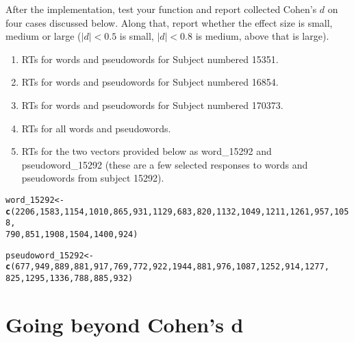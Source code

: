 \documentclass{article}\usepackage[]{graphicx}\usepackage[]{color}
\makeatletter
\newcommand{\hlnum}[1]{\textcolor[rgb]{0.686,0.059,0.569}{#1}}%
\newcommand{\hlstd}[1]{\textcolor[rgb]{0.345,0.345,0.345}{#1}}%
\newcommand{\hlkwb}[1]{\textcolor[rgb]{0.69,0.353,0.396}{#1}}%
\newcommand{\hlkwd}[1]{\textcolor[rgb]{0.737,0.353,0.396}{\textbf{#1}}}%
\newenvironment{kframe}{%
 \def\at@end@of@kframe{}%
 \ifinner\ifhmode%
  \def\at@end@of@kframe{\end{minipage}}%
  \begin{minipage}{\columnwidth}%
 \fi\fi%
 \def\FrameCommand##1{\hskip\@totalleftmargin \hskip-\fboxsep
 \colorbox{shadecolor}{##1}\hskip-\fboxsep
     \hskip-\linewidth \hskip-\@totalleftmargin \hskip\columnwidth}%
 \MakeFramed {\advance\hsize-\width
   \@totalleftmargin\z@ \linewidth\hsize
   \@setminipage}}%
 {\par\unskip\endMakeFramed%
 \at@end@of@kframe}
\newenvironment{knitrout}{}{} %
\makeatother
\begin{document}
After the implementation, test your function and report collected Cohen's $d$ on four cases discussed below. Along that, report whether the effect size is small, medium or large ($|d|<0.5$ is small, $|d|<0.8$ is medium, above that is large).
\begin{enumerate}
    \item RTs for words and pseudowords for Subject numbered 15351.
    \item RTs for words and pseudowords for Subject numbered 16854.
    \item RTs for words and pseudowords for Subject numbered 170373.
    \item RTs for all words and pseudowords.
    \item RTs for the two vectors provided below as word\_15292 and pseudoword\_15292 (these are a few selected responses to words and pseudowords from subject 15292).
\end{enumerate}

\begin{knitrout}
\color{fgcolor}\begin{kframe}
\begin{alltt}
\hlstd{word_15292} \hlkwb{<-} \hlkwd{c}\hlstd{(}\hlnum{2206}\hlstd{,} \hlnum{1583}\hlstd{,} \hlnum{1154}\hlstd{,} \hlnum{1010}\hlstd{,} \hlnum{865}\hlstd{,} \hlnum{931}\hlstd{,} \hlnum{1129}\hlstd{,} \hlnum{683}\hlstd{,} \hlnum{820}\hlstd{,} \hlnum{1132}\hlstd{,} \hlnum{1049}\hlstd{,} \hlnum{1211}\hlstd{,} \hlnum{1261}\hlstd{,} \hlnum{957}\hlstd{,} \hlnum{1058}\hlstd{,}
    \hlnum{790}\hlstd{,} \hlnum{851}\hlstd{,} \hlnum{1908}\hlstd{,} \hlnum{1504}\hlstd{,} \hlnum{1400}\hlstd{,} \hlnum{924}\hlstd{)}

\hlstd{pseudoword_15292} \hlkwb{<-} \hlkwd{c}\hlstd{(}\hlnum{677}\hlstd{,} \hlnum{949}\hlstd{,} \hlnum{889}\hlstd{,} \hlnum{881}\hlstd{,} \hlnum{917}\hlstd{,} \hlnum{769}\hlstd{,} \hlnum{772}\hlstd{,} \hlnum{922}\hlstd{,} \hlnum{1944}\hlstd{,} \hlnum{881}\hlstd{,} \hlnum{976}\hlstd{,} \hlnum{1087}\hlstd{,} \hlnum{1252}\hlstd{,} \hlnum{914}\hlstd{,} \hlnum{1277}\hlstd{,}
    \hlnum{825}\hlstd{,} \hlnum{1295}\hlstd{,} \hlnum{1336}\hlstd{,} \hlnum{788}\hlstd{,} \hlnum{885}\hlstd{,} \hlnum{932}\hlstd{)}
\end{alltt}
\end{kframe}
\end{knitrout}


\section{Going beyond Cohen's d}
\end{document}
